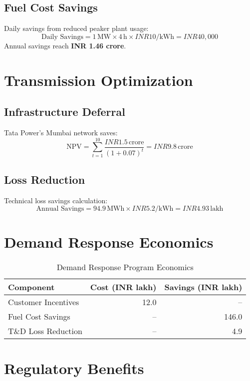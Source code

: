 \documentclass{article}
\begin{document}
\subsection{Fuel Cost Savings}
Daily savings from reduced peaker plant usage:
\begin{equation}
\text{Daily Savings} = 1\,\text{MW} \times 4\,\text{h} \times INR 10/\text{kWh} = INR 40,000
\end{equation}
Annual savings reach \textbf{INR 1.46 crore}.

\section{Transmission Optimization}
\subsection{Infrastructure Deferral}
Tata Power's Mumbai network saves:
\begin{equation}
\text{NPV} = \sum_{t=1}^{10} \frac{INR 1.5\,\text{crore}}{(1+0.07)^t} = INR 9.8\,\text{crore}
\end{equation}

\subsection{Loss Reduction}
Technical loss savings calculation:
\begin{equation}
\text{Annual Savings} = 94.9\,\text{MWh} \times INR 5.2/\text{kWh} = INR 4.93\,\text{lakh}
\end{equation}

\section{Demand Response Economics}
\begin{table}[ht]
\centering
\caption{Demand Response Program Economics}
\begin{tabular}{@{}lrr@{}}
\toprule
Component & Cost (INR  lakh) & Savings (INR  lakh) \\
\midrule
Customer Incentives & 12.0 & -- \\
Fuel Cost Savings & -- & 146.0 \\
T\&D Loss Reduction & -- & 4.9 \\
\bottomrule
\end{tabular}
\label{tab:dresp}
\end{table}

\section{Regulatory Benefits}
\end{document}
